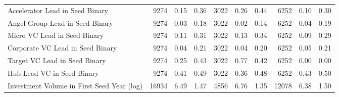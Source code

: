 {\begin{table}[!h]
{\begin{tabular}[t]{lrrrrrrrrr}
\addlinespace
Accelerator Lead in Seed Binary & 9274 & 0.15 & 0.36 & 3022 & 0.26 & 0.44 & 6252 & 0.10 & 0.30\\
Angel Group Lead in Seed Binary & 9274 & 0.03 & 0.18 & 3022 & 0.02 & 0.14 & 6252 & 0.04 & 0.19\\
Micro VC Lead in Seed Binary & 9274 & 0.11 & 0.31 & 3022 & 0.13 & 0.34 & 6252 & 0.09 & 0.29\\
Corporate VC Lead in Seed Binary & 9274 & 0.04 & 0.21 & 3022 & 0.04 & 0.20 & 6252 & 0.05 & 0.21\\
Target VC Lead in Seed Binary & 9274 & 0.25 & 0.43 & 3022 & 0.77 & 0.42 & 6252 & 0.00 & 0.00\\
\addlinespace
Hub Lead VC in Seed Binary & 9274 & 0.41 & 0.49 & 3022 & 0.36 & 0.48 & 6252 & 0.43 & 0.50\\
Investment Volume in First Seed Year (log) & 16934 & 6.49 & 1.47 & 4856 & 6.76 & 1.35 & 12078 & 6.38 & 1.50\\
\bottomrule
\end{tabular}}
\end{table}
}
